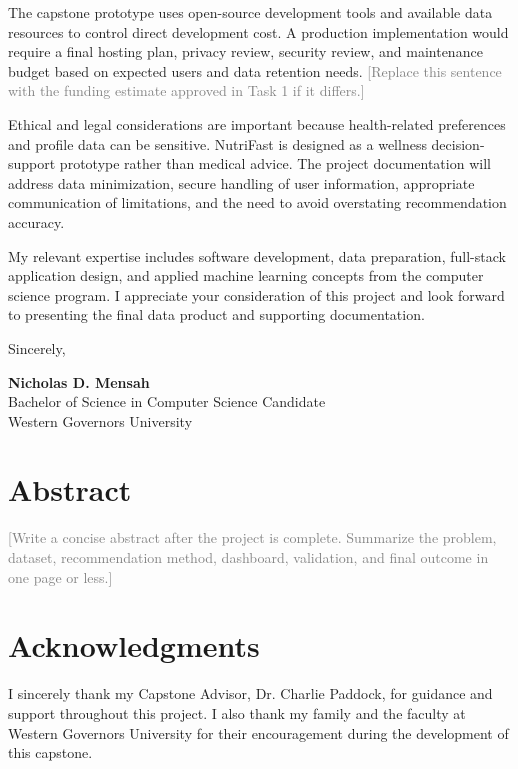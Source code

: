 \documentclass[12pt]{report}
\newcommand{\placeholder}[1]{\textcolor{gray}{[#1]}}
\begin{document}
The capstone prototype uses open-source development tools and available data resources to control direct development cost. A production implementation would require a final hosting plan, privacy review, security review, and maintenance budget based on expected users and data retention needs. \placeholder{Replace this sentence with the funding estimate approved in Task 1 if it differs.}

Ethical and legal considerations are important because health-related preferences and profile data can be sensitive. NutriFast is designed as a wellness decision-support prototype rather than medical advice. The project documentation will address data minimization, secure handling of user information, appropriate communication of limitations, and the need to avoid overstating recommendation accuracy.

My relevant expertise includes software development, data preparation, full-stack application design, and applied machine learning concepts from the computer science program. I appreciate your consideration of this project and look forward to presenting the final data product and supporting documentation.

\vspace{0.5cm}

Sincerely,

\vspace{0.5cm}

\textbf{Nicholas D. Mensah}\\
Bachelor of Science in Computer Science Candidate\\
Western Governors University

\singlespacing
\newpage

\chapter*{Abstract}
\placeholder{Write a concise abstract after the project is complete. Summarize the problem, dataset, recommendation method, dashboard, validation, and final outcome in one page or less.}
\newpage

\chapter*{Acknowledgments}
I sincerely thank my Capstone Advisor, Dr. Charlie Paddock, for guidance and support throughout this project. I also thank my family and the faculty at Western Governors University for their encouragement during the development of this capstone.
\newpage
\end{document}
